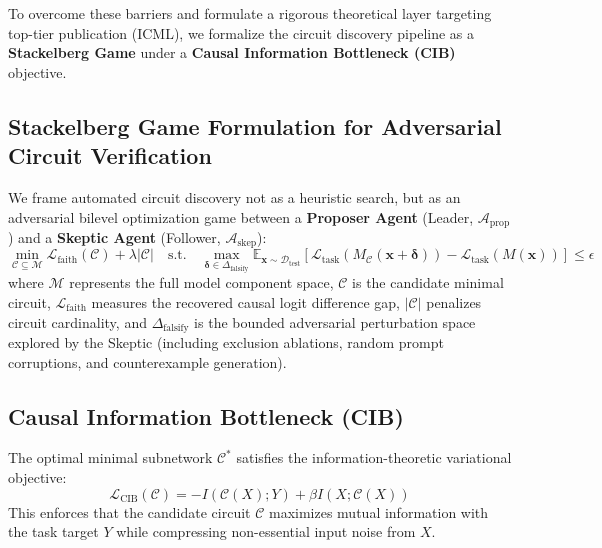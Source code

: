 \documentclass[10pt,a4paper]{article}
\begin{document}
To overcome these barriers and formulate a rigorous theoretical layer targeting top-tier publication (ICML), we formalize the circuit discovery pipeline as a \textbf{Stackelberg Game} under a \textbf{Causal Information Bottleneck (CIB)} objective.

\subsection{Stackelberg Game Formulation for Adversarial Circuit Verification}
We frame automated circuit discovery not as a heuristic search, but as an adversarial bilevel optimization game between a \textbf{Proposer Agent} (Leader, $\mathcal{A}_{\text{prop}}$) and a \textbf{Skeptic Agent} (Follower, $\mathcal{A}_{\text{skep}}$):
\begin{equation}
\min_{\mathcal{C} \subseteq \mathcal{M}} \mathcal{L}_{\text{faith}}(\mathcal{C}) + \lambda |\mathcal{C}| \quad \text{s.t.} \quad \max_{\boldsymbol{\delta} \in \Delta_{\text{falsify}}} \mathbb{E}_{\boldsymbol{x} \sim \mathcal{D}_{\text{test}}} \left[ \mathcal{L}_{\text{task}}(M_{\mathcal{C}}(\boldsymbol{x} + \boldsymbol{\delta})) - \mathcal{L}_{\text{task}}(M(\boldsymbol{x})) \right] \le \epsilon
\end{equation}
where $\mathcal{M}$ represents the full model component space, $\mathcal{C}$ is the candidate minimal circuit, $\mathcal{L}_{\text{faith}}$ measures the recovered causal logit difference gap, $|\mathcal{C}|$ penalizes circuit cardinality, and $\Delta_{\text{falsify}}$ is the bounded adversarial perturbation space explored by the Skeptic (including exclusion ablations, random prompt corruptions, and counterexample generation).

\subsection{Causal Information Bottleneck (CIB)}
The optimal minimal subnetwork $\mathcal{C}^*$ satisfies the information-theoretic variational objective:
\begin{equation}
\mathcal{L}_{\text{CIB}}(\mathcal{C}) = - I(\mathcal{C}(X); Y) + \beta I(X; \mathcal{C}(X))
\end{equation}
This enforces that the candidate circuit $\mathcal{C}$ maximizes mutual information with the task target $Y$ while compressing non-essential input noise from $X$.
\end{document}
